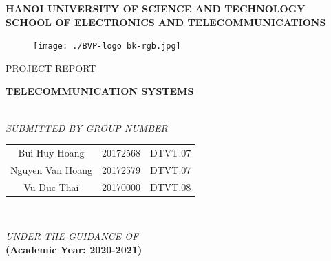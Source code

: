 \documentclass[a4paper, 13pt]{report}
\begin{document}
\begin{titlepage}
\begin{center}
    \textup{\large \textbf{HANOI UNIVERSITY OF SCIENCE AND TECHNOLOGY}\\[0.5cm]\textbf{SCHOOL OF ELECTRONICS AND TELECOMMUNICATIONS}}\\[1cm]
\end{center}
\begin{center}
\begin{figure}[h]  %
\centering
\texttt{[image: ./BVP-logo bk-rgb.jpg]}\\[1cm]
\end{figure}
\textup{\large  PROJECT REPORT\\[1cm]}
\begin{LARGE}
{\textbf {TELECOMMUNICATION SYSTEMS}}\end{LARGE}\\[3cm]
\textit{SUBMITTED BY GROUP NUMBER}\\[0.5cm]
\begin{large}
\begin{tabular}{ c c c }
 Bui Huy Hoang & 20172568 & DTVT.07 \\[0.4cm] 
 Nguyen Van Hoang & 20172579 & DTVT.07 \\ [0.4cm] 
 Vu Duc Thai & 20170000 & DTVT.08 \\ [0.4cm]  
\end{tabular}\\[1cm]
\end{large}
\textit{UNDER THE GUIDANCE OF}\\[0.7cm]
\textbf{(Academic Year: 2020-2021)}
\vfill
\end{center}
\end{titlepage}

\setcounter{page}{1}
\newpage
\tableofcontents
\listoffigures
\listoftables



\newpage
{}
\end{document}
